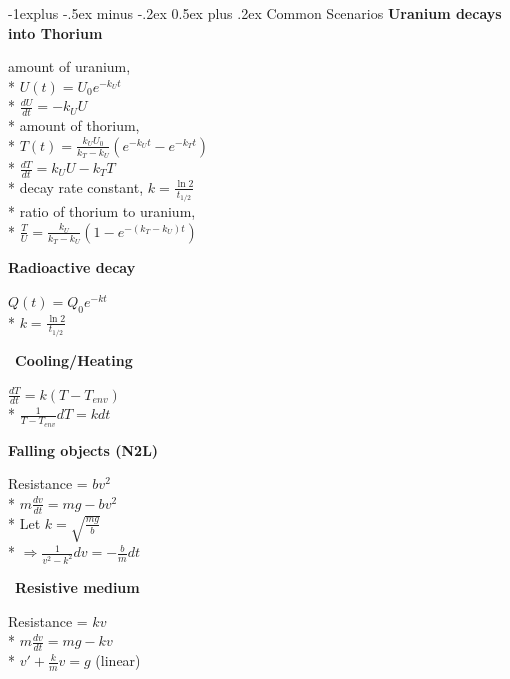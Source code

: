\documentclass[10pt, landscape]{article}
\makeatletter
\newenvironment{tightcenter}{%
  \setlength\topsep{0pt}
  \setlength\parskip{0pt}
  \begin{center}
}{%
  \end{center}
}
\renewcommand{\subsection}{\@startsection{subsection}{2}{0mm}%
                                {-1explus -.5ex minus -.2ex}%
                                {0.5ex plus .2ex}%
                                {\normalfont\normalsize\bfseries}}
\let\Then\Rightarrow
\makeatother
\begin{document}
\begin{multicols*}{4}
\subsection{Common Scenarios}
\textbf{Uranium decays into Thorium}
\begin{tightcenter}
    amount of uranium, 
        \\* $U(t) = U_0e^{-k_Ut}$
        \\* $\frac{dU}{dt} = -k_UU$
    \\* amount of thorium, 
        \\* $T(t) = \frac{k_UU_0}{k_T - k_U}(e^{-k_Ut} - e^{-k_Tt})$
        \\* $\frac{dT}{dt} = k_UU - k_TT$
    \\* decay rate constant, $k = \frac{\ln 2}{t_{1/2}}$
    \\* ratio of thorium to uranium,
        \\* $\frac{T}{U} = \frac{k_U}{k_T - k_U}(1 - e^{-(k_T-k_U)t})$
\end{tightcenter}

\begin{multicols}{2}
    \textbf{Radioactive decay}
    \begin{tightcenter}
        $Q(t) = Q_0e^{-kt}$
        \\* $k = \frac{\ln 2}{t_{1/2}}$
    \end{tightcenter}

    \ \textbf{Cooling/Heating}
    \begin{tightcenter}
        $\frac{dT}{dt} = k(T - T_{env})$
        \\* $\frac{1}{T-T_{env}}dT = kdt$
    \end{tightcenter}
\end{multicols}

\begin{multicols}{2}
    \textbf{Falling objects (N2L)}
    \begin{tightcenter}
        Resistance = $bv^2$
        \\* $m \frac{dv}{dt} = mg - bv^2$
        \\* Let $k = \sqrt{\frac{mg}{b}}$ 
        \\* $\Then \frac{1}{v^2 - k^2} dv = -\frac{b}{m}dt$
    \end{tightcenter}

    \ \textbf{Resistive medium}
    \begin{tightcenter}
        Resistance = $kv$
        \\* $m \frac{dv}{dt} = mg - kv$
        \\* $v' + \frac{k}{m}v = g$ (linear)
        \\ \ 
    \end{tightcenter}
\end{multicols}


\end{multicols*}
\end{document}
